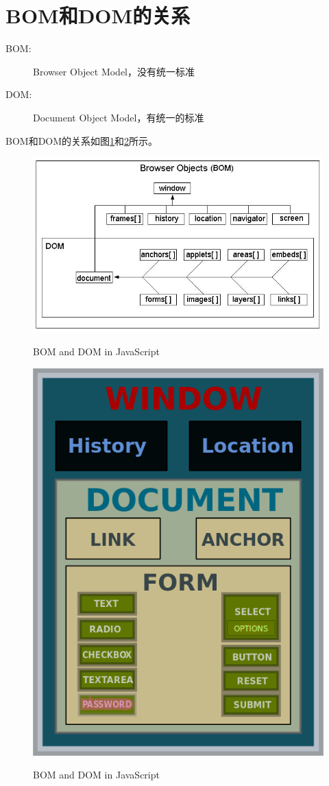 ﻿\section[BOM和DOM的关系]{BOM和DOM的关系}
\begin{description}
  \item[BOM: ] Browser Object Model，没有统一标准
  \item[DOM: ] Document Object Model，有统一的标准
\end{description}

BOM和DOM的关系如图\ref{fig:bom_and_dom}和\ref{fig:bom_and_dom_2}所示。
\begin{figure}
  \centering
  \includegraphics[width=.8\textwidth]{picturedir/js_bom_dom.jpg}\\
  \caption{BOM and DOM in JavaScript}\label{fig:bom_and_dom}
\end{figure}

\begin{figure}
  \centering
  \includegraphics[width=.5\textwidth]{picturedir/js_bom_dom_2.png}\\
  \caption{BOM and DOM in JavaScript}\label{fig:bom_and_dom_2}
\end{figure}



